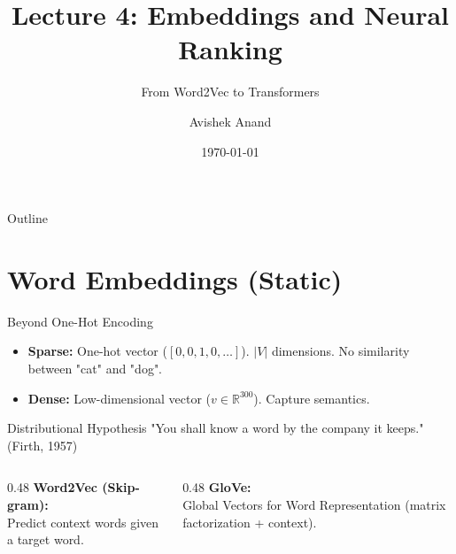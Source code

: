 \documentclass[aspectratio=169]{beamer}
\title[Embeddings \& Neural Ranking]{Lecture 4: Embeddings and Neural Ranking}
\subtitle{From Word2Vec to Transformers}
\author{Avishek Anand}
\institute{Information Retrieval}
\date{\today}
\begin{document}
\begin{frame}
\titlepage
\end{frame}



\begin{frame}{Outline}
\tableofcontents
\end{frame}

\section{Word Embeddings (Static)}

\begin{frame}{Beyond One-Hot Encoding}
\begin{itemize}
    \item \textbf{Sparse:} One-hot vector ($[0, 0, 1, 0, \dots]$). $|V|$ dimensions. No similarity between "cat" and "dog".
    \item \textbf{Dense:} Low-dimensional vector ($v \in \mathbb{R}^{300}$). Capture semantics.
\end{itemize}

\vspace{1em}

\begin{block}{Distributional Hypothesis}
"You shall know a word by the company it keeps." (Firth, 1957)
\end{block}

\vspace{1em}
\begin{columns}
\begin{column}{0.48\textwidth}
\textbf{Word2Vec (Skip-gram):} \\
Predict context words given a target word.
\end{column}
\begin{column}{0.48\textwidth}
\textbf{GloVe:} \\
Global Vectors for Word Representation (matrix factorization + context).
\end{column}
\end{columns}
\end{frame}
\end{document}
